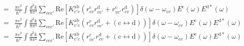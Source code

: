 \documentclass[prb,11pt,tightenlines,twocolumn,aps]{revtex4-1}
\begin{document}
\begin{widetext}
\begin{align}
=&
\frac{\pi e^{2}}{\hbar^{2}} \int \frac{d^{3}k}{8 \pi^{3}}
\sum_{vcc'} \mathrm{Re} 
\left[ 
K^{\mathrm{ab}}_{c'c} 
\left(
r^{\mathrm{c}}_{cv} r^{\mathrm{d}}_{vc'} + 
r^{\mathrm{c}}_{vc'} r^{\mathrm{d}}_{cv}
\right)
\right]
\delta(\omega - \omega_{cv}) 
E^{\mathrm{c}}(\omega) E^{\mathrm{d*}}(\omega)
\nonumber \\
=&
\frac{\pi e^{2}}{\hbar^{2}} \int \frac{d^{3}k}{8 \pi^{3}}
\sum_{vcc'} \mathrm{Re} 
\left[ 
K^{\mathrm{ab}}_{c'c} 
\left(
r^{\mathrm{c}}_{cv} r^{\mathrm{d}}_{vc'} + 
(\mathrm{c} \leftrightarrow \mathrm{d})
\right)
\right]
\delta(\omega - \omega_{cv}) 
E^{\mathrm{c}}(\omega) E^{\mathrm{d*}}(\omega)
\nonumber \\
=&
\frac{\pi e^{2}}{\hbar^{2}} \int \frac{d^{3}k}{8 \pi^{3}}
\sum_{vcc'} \mathrm{Re} 
\left[ 
K^{\mathrm{ab}}_{c'c} 
\left(
r^{\mathrm{c}}_{vc'} r^{\mathrm{d}}_{cv} + 
(\mathrm{c} \leftrightarrow \mathrm{d})
\right)
\right]
\delta(\omega - \omega_{cv}) 
E^{\mathrm{c}}(\omega) E^{\mathrm{d*}}(\omega)
\label{eq:k-final}
\end{align}
\end{widetext}


\end{document}

